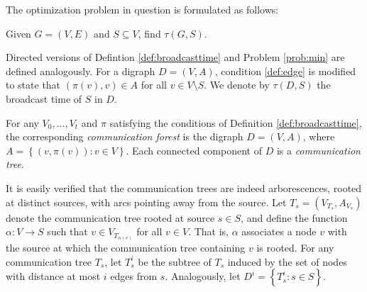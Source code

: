 The optimization problem in question is formulated as follows:
\begin{problem}\label{prob:min}
Given $G=(V,E)$ and $S\subseteq V$, find $\tau(G,S)$.
\end{problem}

Directed versions of Defintion \ref{def:broadcasttime} and Problem \ref{prob:min} are defined analogously.
For a digraph $D=(V,A)$, condition \ref{def:edge} is modified to state that $(\pi(v),v)\in A$ for all $v\in V\setminus S$.
We denote by $\tau(D,S)$ the broadcast time of $S$ in $D$.

\begin{definition} \label{def:broadcastgraph}
For any $V_0,\ldots,V_t$ and $\pi$ satisfying the conditions of Definition \ref{def:broadcasttime},
the corresponding \emph{communication forest} is
the digraph $D=(V,A)$, where $A=\left\{\left(v,\pi(v)\right): v\in V\right\}$.
Each connected component of $D$ is a \emph{communication tree}.
\end{definition}

\noindent
It is easily verified that the communication trees are indeed arborescences, rooted at distinct sources, with arcs pointing away from the source.
Let $T_s=\left(V_{T_s},A_{V_s}\right)$ denote the communication tree rooted at source $s\in S$, and define
the function $\alpha:V\to S$ such that $v\in V_{T_{\alpha(v)}}$ for all $v\in V$.
That is, $\alpha$ associates a node $v$ with the source at which the communication tree containing $v$ is rooted.
For any communication tree $T_s$, let $T^i_s$ be the subtree of $T_s$ induced by the set of nodes with distance at most $i$ edges from $s$.
Analogously, let $D^i=\left\{T_s^i: s\in S\right\}$.


